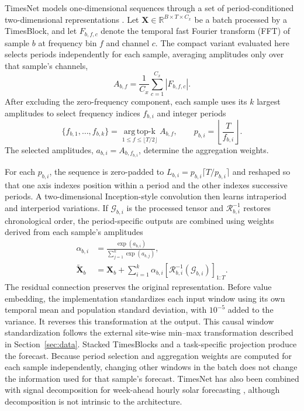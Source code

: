 TimesNet models one-dimensional sequences through a set of
period-conditioned two-dimensional representations \cite{wu2023}. Let
$\mathbf{X}\in\mathbb{R}^{B\times T\times C_x}$ be a batch processed by a
TimesBlock, and let $F_{b,f,c}$ denote the temporal fast Fourier transform
(FFT) of sample $b$ at frequency bin $f$ and channel $c$. The compact variant
evaluated here selects periods independently for each sample, averaging
amplitudes only over that sample's channels,
\begin{equation}
  A_{b,f}
  =
  \frac{1}{C_x}
  \sum_{c=1}^{C_x}\left|F_{b,f,c}\right|.
  \label{eq:timesnet_frequency}
\end{equation}
After excluding the zero-frequency component, each sample uses its $k$
largest amplitudes to select frequency indices $f_{b,i}$ and integer periods
\begin{equation}
  \{f_{b,1},\ldots,f_{b,k}\}
  =
  \operatorname*{arg\,top\text{-}k}_{1\leq f\leq\lfloor T/2\rfloor}
  A_{b,f},
  \qquad
  p_{b,i}=\left\lfloor\frac{T}{f_{b,i}}\right\rfloor .
  \label{eq:timesnet_periods}
\end{equation}
The selected amplitudes, $a_{b,i}=A_{b,f_{b,i}}$, determine the aggregation
weights.

For each $p_{b,i}$, the sequence is zero-padded to
$L_{b,i}=p_{b,i}\lceil T/p_{b,i}\rceil$ and reshaped so that one axis indexes
position within a period and the other indexes successive periods. A
two-dimensional Inception-style convolution then learns intraperiod and
interperiod variations. If $\mathcal{G}_{b,i}$ is the processed tensor and
$\mathcal{R}_{b,i}^{-1}$ restores chronological order, the period-specific
outputs are combined using weights derived from each sample's amplitudes
\begin{equation}
\begin{aligned}
  \alpha_{b,i}
  &=
  \frac{\exp(a_{b,i})}
       {\sum_{j=1}^{k}\exp(a_{b,j})},
  \\
  \widetilde{\mathbf{X}}_b
  &=
  \mathbf{X}_b
  +
  \sum_{i=1}^{k}
  \alpha_{b,i}
  \left[
    \mathcal{R}_{b,i}^{-1}(\mathcal{G}_{b,i})
  \right]_{1:T}.
\end{aligned}
  \label{eq:timesnet_aggregation}
\end{equation}
The residual connection preserves the original representation. Before value
embedding, the implementation standardizes each input window using its own
temporal mean and population standard deviation, with $10^{-5}$ added to the
variance. It reverses this transformation at the output. This causal window
standardization follows the external site-wise min--max transformation
described in Section~\ref{sec:data}. Stacked TimesBlocks and a task-specific
projection produce the forecast. Because period selection and aggregation
weights are computed for each sample independently, changing other windows
in the batch does not change the information used for that sample's forecast.
TimesNet has also been combined with signal decomposition for week-ahead
hourly solar forecasting \cite{zhao2024timesnet}, although decomposition is
not intrinsic to the architecture.

